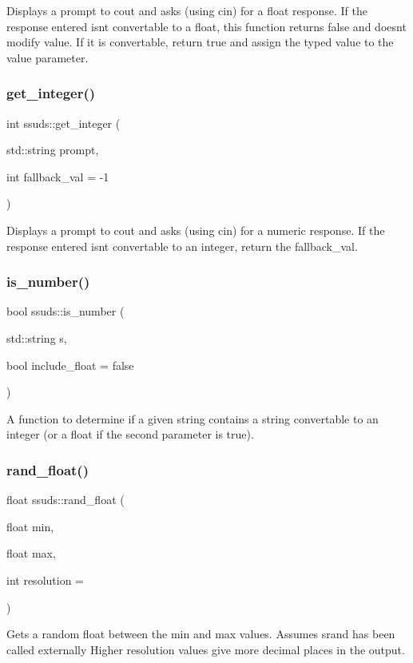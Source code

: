 Displays a prompt to cout and asks (using cin) for a float response. If the response entered isn\textquotesingle{}t convertable to a float, this function returns false and doesn\textquotesingle{}t modify value. If it is convertable, return true and assign the typed value to the value parameter. \mbox{\label{namespacessuds_a3146bc135f96f478eef61482cfe60738}} 
\subsubsection{\texorpdfstring{get\_integer()}{get\_integer()}}
{\footnotesize\ttfamily int ssuds\+::get\+\_\+integer (\begin{DoxyParamCaption}\item[{std\+::string}]{prompt,  }\item[{int}]{fallback\+\_\+val = {\ttfamily -\/1} }\end{DoxyParamCaption})}

Displays a prompt to cout and asks (using cin) for a numeric response. If the response entered isn\textquotesingle{}t convertable to an integer, return the fallback\+\_\+val. \mbox{\label{namespacessuds_a636fd424d2a3e918dc8e8e367eb3ae34}} 
\subsubsection{\texorpdfstring{is\_number()}{is\_number()}}
{\footnotesize\ttfamily bool ssuds\+::is\+\_\+number (\begin{DoxyParamCaption}\item[{std\+::string}]{s,  }\item[{bool}]{include\+\_\+float = {\ttfamily false} }\end{DoxyParamCaption})}

A function to determine if a given string contains a string convertable to an integer (or a float if the second parameter is true). \mbox{\label{namespacessuds_a0997aebd2d382353fa6622a2bade3925}} 
\subsubsection{\texorpdfstring{rand\_float()}{rand\_float()}}
{\footnotesize\ttfamily float ssuds\+::rand\+\_\+float (\begin{DoxyParamCaption}\item[{float}]{min,  }\item[{float}]{max,  }\item[{int}]{resolution = {} }\end{DoxyParamCaption})}

Gets a random float between the min and max values. Assumes srand has been called externally Higher resolution values give more decimal places in the output. 